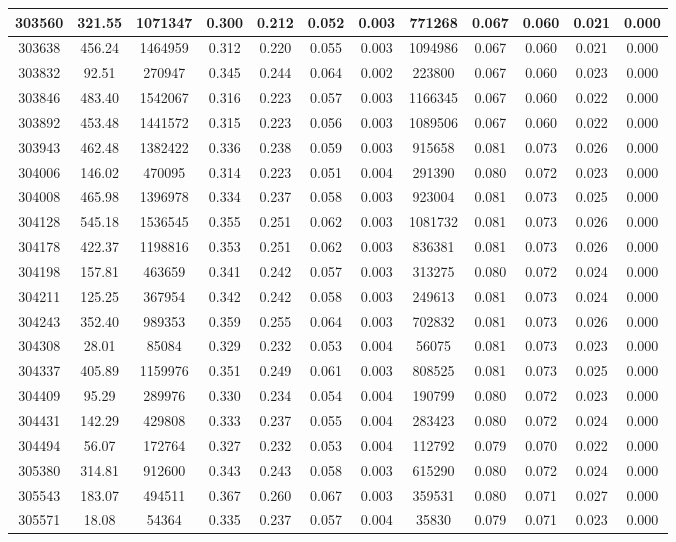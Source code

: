 \documentclass[10pt]{extarticle}
\begin{document}
\begin{longtable}{|c|c|c|c|c|c|c|c|c|c|c|c|}
\hline 
303560&321.55&1071347&0.300&0.212&0.052&0.003&771268&0.067&0.060&0.021&0.000 \\ 
\hline 
303638&456.24&1464959&0.312&0.220&0.055&0.003&1094986&0.067&0.060&0.021&0.000 \\ 
\hline 
303832&92.51&270947&0.345&0.244&0.064&0.002&223800&0.067&0.060&0.023&0.000 \\ 
\hline 
303846&483.40&1542067&0.316&0.223&0.057&0.003&1166345&0.067&0.060&0.022&0.000 \\ 
\hline 
303892&453.48&1441572&0.315&0.223&0.056&0.003&1089506&0.067&0.060&0.022&0.000 \\ 
\hline 
303943&462.48&1382422&0.336&0.238&0.059&0.003&915658&0.081&0.073&0.026&0.000 \\ 
\hline 
304006&146.02&470095&0.314&0.223&0.051&0.004&291390&0.080&0.072&0.023&0.000 \\ 
\hline 
304008&465.98&1396978&0.334&0.237&0.058&0.003&923004&0.081&0.073&0.025&0.000 \\ 
\hline 
304128&545.18&1536545&0.355&0.251&0.062&0.003&1081732&0.081&0.073&0.026&0.000 \\ 
\hline 
304178&422.37&1198816&0.353&0.251&0.062&0.003&836381&0.081&0.073&0.026&0.000 \\ 
\hline 
304198&157.81&463659&0.341&0.242&0.057&0.003&313275&0.080&0.072&0.024&0.000 \\ 
\hline 
304211&125.25&367954&0.342&0.242&0.058&0.003&249613&0.081&0.073&0.024&0.000 \\ 
\hline 
304243&352.40&989353&0.359&0.255&0.064&0.003&702832&0.081&0.073&0.026&0.000 \\ 
\hline 
304308&28.01&85084&0.329&0.232&0.053&0.004&56075&0.081&0.073&0.023&0.000 \\ 
\hline 
304337&405.89&1159976&0.351&0.249&0.061&0.003&808525&0.081&0.073&0.025&0.000 \\ 
\hline 
304409&95.29&289976&0.330&0.234&0.054&0.004&190799&0.080&0.072&0.023&0.000 \\ 
\hline 
304431&142.29&429808&0.333&0.237&0.055&0.004&283423&0.080&0.072&0.024&0.000 \\ 
\hline 
304494&56.07&172764&0.327&0.232&0.053&0.004&112792&0.079&0.070&0.022&0.000 \\ 
\hline 
305380&314.81&912600&0.343&0.243&0.058&0.003&615290&0.080&0.072&0.024&0.000 \\ 
\hline 
305543&183.07&494511&0.367&0.260&0.067&0.003&359531&0.080&0.071&0.027&0.000 \\ 
\hline 
305571&18.08&54364&0.335&0.237&0.057&0.004&35830&0.079&0.071&0.023&0.000 \\ 

\end{longtable}
\end{document}
